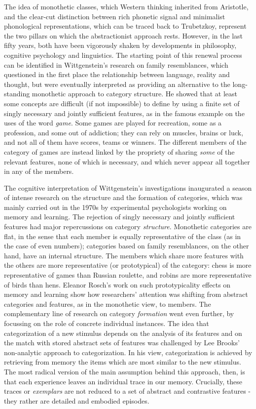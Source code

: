 The idea of monothetic classes, which Western thinking inherited from Aristotle, and the clear-cut distinction between rich phonetic signal and minimalist phonological representations, which can be traced back to Trubetzkoy, represent the two pillars on which the abstractionist approach rests. However, in the last fifty years, both have been vigorously shaken by developments in philosophy, cognitive psychology and linguistics. The starting point of this renewal process can be identified in Wittgenstein's research on family resemblances, which questioned in the first place the relationship between language, reality and thought, but were eventually interpreted as providing an alternative to the long-standing monothetic approach to category structure. He showed that at least some concepts are difficult (if not impossible) to define by using a finite set of singly necessary and jointly sufficient features, as in the famous example on the uses of the word \textit{game}. Some games are played for recreation, some as a profession, and some out of addiction; they can rely on muscles, brains or luck, and not all of them have scores, teams or winners. The different members of the category of games are instead linked by the propriety of sharing \textit{some} of the relevant features, none of which is necessary, and which never appear all together in any of the members.

The cognitive interpretation of Wittgenstein's investigations inaugurated a season of intense research on the structure and the formation of categories, which was mainly carried out in the 1970s by experimental psychologists working on memory and learning. The rejection of singly necessary and jointly sufficient features had major repercussions on category \textit{structure}. Monothetic categories are flat, in the sense that each member is equally representative of the class (as in the case of even numbers); categories based on family resemblances, on the other hand, have an internal structure. The members which share more features with the others are more representative (or prototypical) of the category: chess is more representative of games than Russian roulette, and robins are more representative of birds than hens. Eleanor Rosch's work on such prototypicality effects on memory and learning show how researchers' attention was shifting from abstract categories and features, as in the monothetic view, to members. The complementary line of research on category \textit{formation} went even further, by focussing on the role of concrete individual instances. The idea that categorization of a new stimulus depends on the analysis of its features and on the match with stored abstract sets of features was challenged by Lee Brooks' non-analytic approach to categorization. In his view, categorization is achieved by retrieving from memory the items which are most similar to the new stimulus. The most radical version of the main assumption behind this approach, then, is that each experience leaves an individual trace in our memory. Crucially, these traces or \textit{exemplars} are not reduced to a set of abstract and contrastive features - they rather are detailed and embodied episodes.

